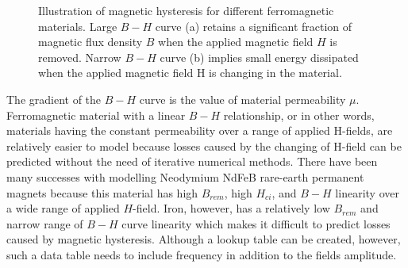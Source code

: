         
        \begin{figure}[!ht]
            \centering
            \qquad
            \caption{
                Illustration of magnetic hysteresis for different ferromagnetic materials. Large $B-H$ curve (a) retains a significant fraction of magnetic flux density $B$ when the applied magnetic field $H$ is removed. Narrow $B-H$ curve (b) implies small energy dissipated when the applied magnetic field H is changing in the material.
            }   \label{fig:chapter/background/bh loop}
        \end{figure}
        
        
        The gradient of the $B-H$ curve is the value of material permeability $\mu$. Ferromagnetic material with a linear $B-H$ relationship, or in other words, materials having the constant permeability over a range of applied H-fields, are relatively easier to model because losses caused by the changing of H-field can be predicted without the need of iterative numerical methods. There have been many successes with modelling Neodymium NdFeB rare-earth permanent magnets because this material has high $B_{rem}$, high $H_{ci}$, and $B-H$ linearity over a wide range of applied $H$-field. Iron, however, has a relatively low $B_{rem}$ and narrow range of $B-H$ curve linearity which makes it difficult to predict losses caused by magnetic hysteresis. Although a lookup table can be created, however, such a data table needs to include frequency in addition to the fields amplitude. 
        
